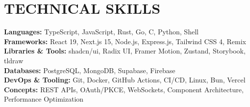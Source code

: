 \documentclass[letterpaper, 10pt]{article}
\begin{document}
  \section{TECHNICAL SKILLS}
  \begin{itemize}[leftmargin=0.15in, label={}]
    \small{\item{ \textbf{\normalsize{Languages:}}{ \normalsize{TypeScript, JavaScript, Rust, Go, C, Python, Shell}} \\ \textbf{\normalsize{Frameworks:}}{ \normalsize{React 19, Next.js 15, Node.js, Express.js, Tailwind CSS 4, Remix}} \\ \textbf{\normalsize{Libraries \& Tools:}}{ \normalsize{shadcn/ui, Radix UI, Framer Motion, Zustand, Storybook, tldraw}} \\ \textbf{\normalsize{Databases:}}{ \normalsize{PostgreSQL, MongoDB, Supabase, Firebase}} \\ \textbf{\normalsize{DevOps \& Tooling:}}{ \normalsize{Git, Docker, GitHub Actions, CI/CD, Linux, Bun, Vercel}} \\ \textbf{\normalsize{Concepts:}}{ \normalsize{REST APIs, OAuth/PKCE, WebSockets, Component Architecture, Performance Optimization}} \\ }}
  \end{itemize}
  \vspace{-15pt}

\end{document}
